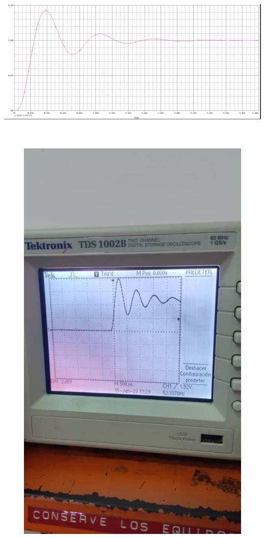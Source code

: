 \documentclass[12pt]{article}
\begin{document}
\begin{enumerate}
\begin{itemize}
    		
    		\begin{center}
    			\includegraphics[width=16cm,height=8cm]{Img/subamor_2}
    		\end{center}
    		
    		\begin{center}
    			\includegraphics[width=16cm,height=20cm]{Img/subamor_lab2}
    		\end{center}
    		

\end{itemize}
\end{enumerate}
\end{document}
